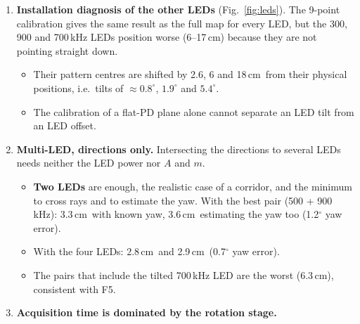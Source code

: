 \documentclass[10.5pt,a4paper]{article}
\newcommand{\cm}{\,cm}
\begin{document}
\begin{enumerate}[label=\textbf{F\arabic*.},leftmargin=8mm]
\begin{itemize}
  \item Two points (nadir + one at $\approx20^\circ$) are the theoretical minimum, but fragile.
  \item A regular $3\times3$ or $4\times4$ grid over the working area reaches the full-map result
    (3.5--3.6\cm). Ten random points give 3.8\cm; points clustered near the LED fail.
  \item The reason: the measured pattern is \emph{not} a single $\cos^m$. The apparent $m$ drops from
    $\approx11$ near the axis to $\approx6$ beyond $20^\circ$. The calibration points must therefore
    cover the angles used for positioning. The $\cos^m$ model floor is 3.1\cm.
  \item The same 9 points also calibrate the LED $XY$ (within 3\,mm, 3.5\cm\ error). The LED
    \emph{height} cannot be identified from a single plane: it must be measured, or a second plane is
    needed.
  \end{itemize}
\item \textbf{Installation diagnosis of the other LEDs} (Fig.~\ref{fig:leds}). The 9-point
  calibration gives the same result as the full map for every LED, but the 300, 900 and 700\,kHz LEDs
  position worse (6--17\cm) because they are not pointing straight down.
  \begin{itemize}
  \item Their pattern centres are shifted by 2.6, 6 and 18\cm\ from their physical positions, i.e.\
    tilts of $\approx0.8^\circ$, $1.9^\circ$ and $5.4^\circ$.
  \item The calibration of a flat-PD plane alone cannot separate an LED tilt from an LED offset.
  \end{itemize}
\item \textbf{Multi-LED, directions only.} Intersecting the directions to several LEDs needs neither
  the LED power nor $A$ and $m$.
  \begin{itemize}
  \item \textbf{Two LEDs} are enough, the realistic case of a corridor, and the minimum to cross rays
    and to estimate the yaw. With the best pair (500 + 900\,kHz): 3.3\cm\ with known yaw, 3.6\cm\
    estimating the yaw too (1.2$^\circ$ yaw error).
  \item With the four LEDs: 2.8\cm\ and 2.9\cm\ (0.7$^\circ$ yaw error).
  \item The pairs that include the tilted 700\,kHz LED are the worst (6.3\cm), consistent with F5.
  \end{itemize}
\item \textbf{Acquisition time is dominated by the rotation stage.}

\end{enumerate}
\end{document}
